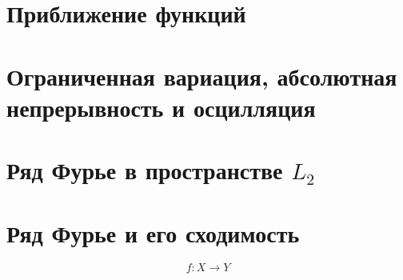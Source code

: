 


% 

\section{Приближение функций}



\section{Ограниченная вариация, абсолютная непрерывность и осцилляция}



\section{Ряд Фурье в пространстве \texorpdfstring{$L_2$}{L2}}



\section{Ряд Фурье и его сходимость}




\begin{equation*}
    f \colon  X \to Y
\end{equation*}